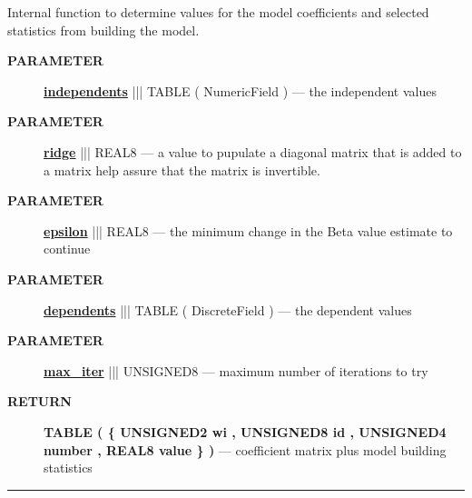 Internal function to determine values for the model coefficients and selected statistics from building the model.






\par
\begin{description}
\item [\colorbox{tagtype}{\color{white} \textbf{\textsf{PARAMETER}}}] \textbf{\underline{independents}} ||| TABLE ( NumericField ) --- the independent values
\item [\colorbox{tagtype}{\color{white} \textbf{\textsf{PARAMETER}}}] \textbf{\underline{ridge}} ||| REAL8 --- a value to pupulate a diagonal matrix that is added to a matrix help assure that the matrix is invertible.
\item [\colorbox{tagtype}{\color{white} \textbf{\textsf{PARAMETER}}}] \textbf{\underline{epsilon}} ||| REAL8 --- the minimum change in the Beta value estimate to continue
\item [\colorbox{tagtype}{\color{white} \textbf{\textsf{PARAMETER}}}] \textbf{\underline{dependents}} ||| TABLE ( DiscreteField ) --- the dependent values
\item [\colorbox{tagtype}{\color{white} \textbf{\textsf{PARAMETER}}}] \textbf{\underline{max\_iter}} ||| UNSIGNED8 --- maximum number of iterations to try
\end{description}







\par
\begin{description}
\item [\colorbox{tagtype}{\color{white} \textbf{\textsf{RETURN}}}] \textbf{TABLE ( \{ UNSIGNED2 wi , UNSIGNED8 id , UNSIGNED4 number , REAL8 value \} )} --- coefficient matrix plus model building statistics
\end{description}




\rule{\linewidth}{0.5pt}
